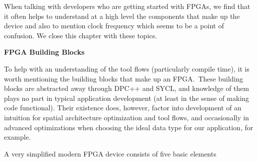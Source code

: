 When talking with developers who are getting started with FPGAs, we find that it often helps to understand at a high level the components that make up the device and also to mention clock frequency which seems to be a point of confusion. We close this chapter with these topics.\par

\hspace*{\fill} \par %
\textbf{FPGA Building Blocks}

To help with an understanding of the tool flows (particularly compile time), it is worth mentioning the building blocks that make up an FPGA. These building blocks are abstracted away through DPC++ and SYCL, and knowledge of them plays no part in typical application development (at least in the sense of making code functional). Their existence does, however, factor into development of an intuition for spatial architecture optimization and tool flows, and occasionally in advanced optimizations when choosing the ideal data type for our application, for example.\par

A very simplified modern FPGA device consists of five basic elements\par

